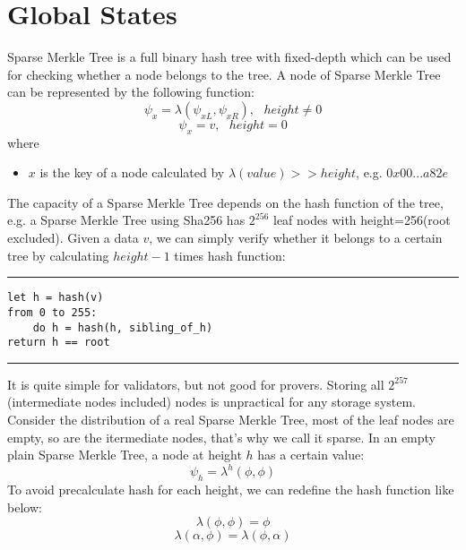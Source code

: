 \documentclass[a4paper,12pt]{article}
\begin{document}
\section{Global States}
\label{sec:orga993e4b}
Sparse Merkle Tree is a full binary hash tree with fixed-depth which can be used for checking whether a node belongs to the tree. A node of Sparse Merkle Tree can be represented by the following function:
\begin{equation*}
    \psi_{x} = \lambda(\psi_{xL}, \psi_{xR}), \text{ } height \ne 0
\end{equation*}
\begin{equation*}
    \psi_{x} = v, \text{ } height = 0
\end{equation*}
where
\begin{itemize}
    \item $x$ is the key of a node calculated by $\lambda(value) >> height$, e.g. $0x00...a82e$
\end{itemize}
The capacity of a Sparse Merkle Tree depends on the hash function of the tree, e.g. a Sparse Merkle Tree using Sha256 has \(2^{256}\) leaf nodes with height=256(root excluded).
Given a data \(v\), we can simply verify whether it belongs to a certain tree by calculating \(height-1\) times hash function:

\noindent\rule{\textwidth}{0.5pt}
\begin{verbatim}
let h = hash(v)
from 0 to 255:
    do h = hash(h, sibling_of_h)
return h == root
\end{verbatim}

\noindent\rule{\textwidth}{0.5pt}
It is quite simple for validators, but not good for provers. Storing all \(2^{257}\) (intermediate nodes included) nodes is unpractical for any storage system. Consider the distribution of a real Sparse Merkle Tree, most of the leaf nodes are empty, so are the itermediate nodes, that's why we call it sparse. In an empty plain Sparse Merkle Tree, a node at height \(h\) has a certain value:
\begin{equation*}
    \psi_{h} = \lambda^{h}(\phi, \phi)
\end{equation*}
To avoid precalculate hash for each height, we can redefine the hash function like below:
\begin{equation*}
    \lambda(\phi, \phi) = \phi
\end{equation*}
\begin{equation*}
    \lambda(\alpha, \phi) = \lambda(\phi, \alpha)
\end{equation*}
\end{document}
